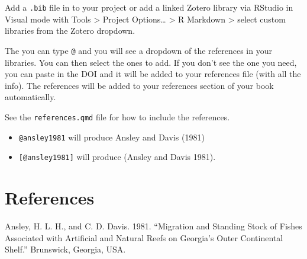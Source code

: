 \documentclass[
  letterpaper,
  oneside,
  open=any]{scrbook}
\newlength{\cslhangindent}
\newenvironment{CSLReferences}[2] %
 {\begin{list}{}{%
  \setlength{\itemindent}{0pt}
  \setlength{\leftmargin}{0pt}
  \setlength{\parsep}{0pt}
  \ifodd #1
   \setlength{\leftmargin}{\cslhangindent}
   \setlength{\itemindent}{-1\cslhangindent}
  \fi
  \setlength{\itemsep}{#2\baselineskip}}}
 {\end{list}}
\begin{document}
Add a \texttt{.bib} file in to your project or add a linked Zotero
library via RStudio in Visual mode with Tools \textgreater{} Project
Options\ldots{} \textgreater{} R Markdown \textgreater{} select custom
libraries from the Zotero dropdown.

The you can type \texttt{@} and you will see a dropdown of the
references in your libraries. You can then select the ones to add. If
you don't see the one you need, you can paste in the DOI and it will be
added to your references file (with all the info). The references will
be added to your references section of your book automatically.

See the \texttt{references.qmd} file for how to include the references.

\begin{itemize}
\item
  \texttt{@ansley1981} will produce Ansley and Davis (1981)
\item
  \texttt{{[}@ansley1981{]}} will produce (Ansley and Davis 1981).
\end{itemize}


\chapter*{References}\label{references-1}


\label{refs}
\begin{CSLReferences}{1}{0}
Ansley, H. L. H., and C. D. Davis. 1981. {``Migration and Standing Stock
of Fishes Associated with Artificial and Natural Reefs on Georgia{'}s
Outer Continental Shelf.''} Brunswick, Georgia, USA.

\end{CSLReferences}


\backmatter
\end{document}
